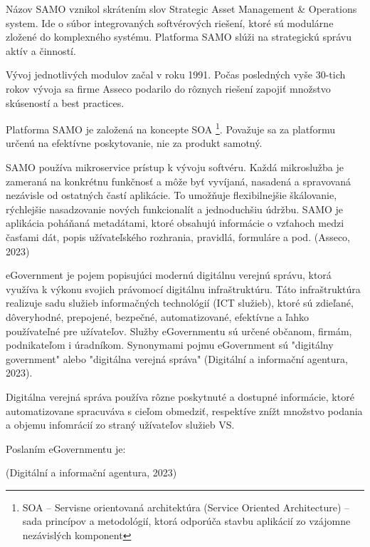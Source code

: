 
Názov SAMO vznikol skrátením slov Strategic Asset Management \& Operations system. Ide o súbor integrovaných softvérových riešení, ktoré sú modulárne zložené do komplexného systému. Platforma SAMO slúži na strategickú správu aktív a činností.

Vývoj jednotlivých modulov začal v roku 1991. Počas posledných vyše 30-tich rokov vývoja sa firme Asseco podarilo do rôznych riešení zapojiť množstvo skúseností a best practices.

Platforma SAMO je založená na koncepte SOA \footnote{SOA -- Servisne orientovaná architektúra (Service Oriented Architecture) -- sada princípov a metodológií, ktorá odporúča stavbu aplikácií zo vzájomne nezávislých komponent}. Považuje sa za platformu určenú na efektívne poskytovanie, nie za produkt samotný.

SAMO používa mikroservice prístup k vývoju softvéru. Každá mikroslužba je zameraná na konkrétnu funkčnosť a môže byť vyvíjaná, nasadená a spravovaná nezávisle od ostatných častí aplikácie. To umožňuje flexibilnejšie škálovanie, rýchlejšie nasadzovanie nových funkcionalít a jednoduchšiu údržbu. SAMO je aplikácia poháňaná metadátami, ktoré obsahujú informácie o vzťahoch medzi časťami  dát, popis užívateľského rozhrania, pravidlá, formuláre a pod. \scr(Asseco, 2023)


eGovernment je pojem popisujúci modernú digitálnu verejnú správu, ktorá využíva k výkonu svojich právomocí digitálnu infraštruktúru. Táto infraštruktúra realizuje sadu služieb informačných technológií (ICT služieb), ktoré sú zdieľané, dôveryhodné, prepojené, bezpečné, automatizované, efektívne a ľahko používateľné pre užívateľov. Služby eGovernmentu sú určené občanom, firmám, podnikateľom i úradníkom. Synonymami pojmu eGovernment sú "digitálny government" alebo "digitálna verejná správa" \scr(Digitální a informační agentura, 2023).

Digitálna verejná správa používa rôzne poskytnuté a dostupné informácie, ktoré automatizovane spracuváva s cieľom obmedziť, respektíve znížt množstvo podania a objemu infomrácií zo straný užívateľov služieb VS.

Poslaním eGovernmentu je: 

 \scr(Digitální a informační agentura, 2023)

